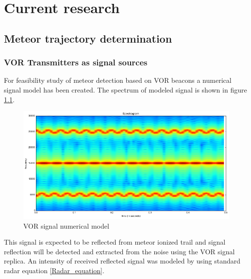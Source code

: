\documentclass[twoside]{ctuthesis}
\theoremstyle{plain}
\theoremstyle{definition}
\theoremstyle{note}
\begin{document}
\chapter{Current research}

\section{Meteor trajectory determination}


\subsection{VOR Transmitters as signal sources}

For feasibility study of meteor detection based on VOR beacons a numerical signal model has been created. The spectrum of modeled signal is shown in figure \ref{VOR_signal}.

\begin{figure}
\includegraphics[width=\textwidth]{./img/VOR_signal.png}
\caption{VOR signal numerical model}
\label{VOR_signal}
\end{figure}

This signal is expected to be reflected from meteor ionized trail and signal reflection will be detected and extracted from the noise using the VOR signal replica. An intensity of received reflected signal was modeled by using standard radar equation \ref{Radar_equation}.
\end{document}

